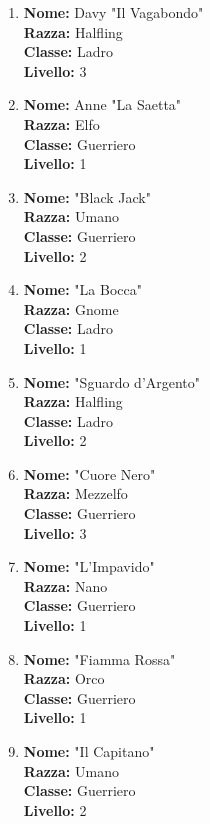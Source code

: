 \documentclass{article}
\begin{document}
\begin{enumerate}
  \item \textbf{Nome:} Davy "Il Vagabondo"\\
  \textbf{Razza:} Halfling\\
  \textbf{Classe:} Ladro\\
  \textbf{Livello:} 3

  \item \textbf{Nome:} Anne "La Saetta"\\
  \textbf{Razza:} Elfo\\
  \textbf{Classe:} Guerriero\\
  \textbf{Livello:} 1

  \item \textbf{Nome:} "Black Jack"\\
  \textbf{Razza:} Umano\\
  \textbf{Classe:} Guerriero\\
  \textbf{Livello:} 2

  \item \textbf{Nome:} "La Bocca"\\
  \textbf{Razza:} Gnome\\
  \textbf{Classe:} Ladro\\
  \textbf{Livello:} 1

  \item \textbf{Nome:} "Sguardo d'Argento"\\
  \textbf{Razza:} Halfling\\
  \textbf{Classe:} Ladro\\
  \textbf{Livello:} 2

  \item \textbf{Nome:} "Cuore Nero"\\
  \textbf{Razza:} Mezzelfo\\
  \textbf{Classe:} Guerriero\\
  \textbf{Livello:} 3

  \item \textbf{Nome:} "L'Impavido"\\
  \textbf{Razza:} Nano\\
  \textbf{Classe:} Guerriero\\
  \textbf{Livello:} 1

  \item \textbf{Nome:} "Fiamma Rossa"\\
  \textbf{Razza:} Orco\\
  \textbf{Classe:} Guerriero\\
  \textbf{Livello:} 1

  \item \textbf{Nome:} "Il Capitano"\\
  \textbf{Razza:} Umano\\
  \textbf{Classe:} Guerriero\\
  \textbf{Livello:} 2


\end{enumerate}
\end{document}
